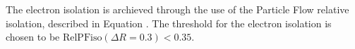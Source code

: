 The electron isolation is archieved through the use of the Particle Flow relative isolation,
described in Equation .
The threshold for the electron isolation is
chosen to be $\text{RelPFiso}(\Delta R = 0.3) < 0.35$. 
